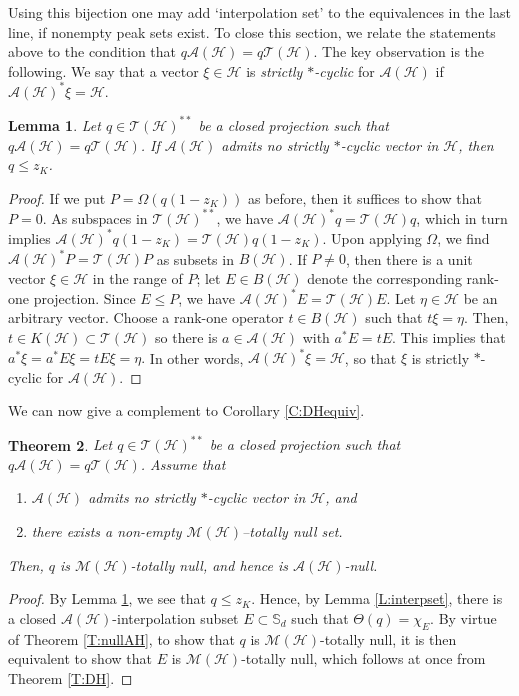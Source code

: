 \documentclass[10pt]{amsart}
\newcommand{\bS}{{\mathbb{S}}}
\newcommand{\A}{{\mathcal{A}}}
\renewcommand{\H}{{\mathcal{H}}}
\newcommand{\M}{{\mathcal{M}}}
\newcommand{\T}{{\mathcal{T}}}
\newtheorem{lemma}{Lemma}[section]
\newtheorem{theorem}[lemma]{Theorem}
\theoremstyle{definition}
\begin{document}
Using this bijection one may 
add `interpolation set' to the equivalences in the last line, if nonempty peak sets exist.
To close this section,
we relate the statements above to the condition that %
$q\A(\H)=q\T(\H)$. The key observation is the following. We say that a vector $\xi\in \H$ is 
\emph{strictly $*$-cyclic} for  $\A(\H)$ if $\A(\H)^*\xi=\H$. 


\begin{lemma}\label{L:qz}
Let $q\in \T(\H)^{**}$ be a closed projection such that $q\A(\H)=q\T(\H)$. If $\A(\H)$ admits no strictly $*$-cyclic vector in $\H$, then $q\leq z_K$.
\end{lemma}
\begin{proof}
If we put $P=\Omega(q(1-z_K))$ as before, then it suffices to show that $P=0$. As subspaces in $\T(\H)^{**}$, we have $\A(\H)^*q=\T(\H)q$, which in turn implies $\A(\H)^*q(1-z_K)=\T(\H)q(1-z_K)$. Upon applying $\Omega$, we find $\A(\H)^*P=\T(\H)P$ as subsets in $B(\H)$. If $P\neq 0$, then there is a unit vector $\xi\in \H$ in the range of $P$; let $E\in B(\H)$ denote the corresponding rank-one projection. Since $E\leq P$, we have $\A(\H)^*E=\T(\H)E$. Let $\eta\in \H$ be an arbitrary vector. Choose a rank-one operator  $t\in B(\H)$ such that $t\xi=\eta$. Then, $t\in 
K(\H) \subset \T(\H)$ so there is $a\in \A(\H)$ with $a^*E=tE$. This implies that 
$
a^*\xi=a^*E\xi=tE\xi=\eta.
$
In other words, $\A(\H)^*\xi=\H$, so that $\xi$ is strictly $*$-cyclic for $\A(\H)$.
\end{proof}

We can now give a complement to Corollary \ref{C:DHequiv}.

\begin{theorem}\label{T:ncDH}
Let $q\in \T(\H)^{**}$ be a closed projection such that $q\A(\H)=q\T(\H)$. Assume that
\begin{enumerate}[{\rm (i)}]
\item $\A(\H)$ admits no strictly $*$-cyclic vector in $\H$, and
\item there exists a non-empty $\M(\H)$--totally null set.
\end{enumerate}
Then, $q$ is $\M(\H)$-totally null, and hence is $\A(\H)$-null.
\end{theorem}
\begin{proof}
By Lemma \ref{L:qz}, we see that $q\leq z_K$. Hence, by Lemma  \ref{L:interpset}, there is a closed $\A(\H)$-interpolation subset $E\subset \bS_d$ such that $\Theta(q)=\chi_E$.  By virtue of Theorem \ref{T:nullAH}, to show that $q$ is $\M(\H)$-totally null, it is then equivalent to show that $E$ is $\M(\H)$-totally null, which follows at once from Theorem \ref{T:DH}.
\end{proof}
\end{document}

